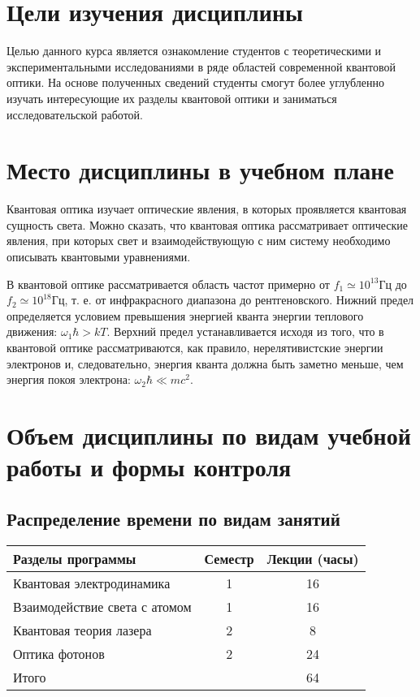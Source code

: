 


\Russian


\section{Цели изучения дисциплины}
Целью данного курса является ознакомление студентов с теоретическими и
экспериментальными исследованиями в ряде областей современной
квантовой оптики.  На основе полученных сведений студенты смогут более
углубленно  изучать интересующие их разделы квантовой оптики и
заниматься исследовательской работой. 

\section{Место дисциплины в учебном плане}
Квантовая оптика изучает оптические явления, в которых проявляется
квантовая сущность света. Можно сказать, что квантовая оптика
рассматривает оптические явления, при которых свет и взаимодействующую
с ним систему необходимо описывать квантовыми уравнениями. 

В квантовой оптике рассматривается область частот примерно от 
\(f_1 \simeq 10^{13} \mbox{Гц}\) до \(f_2 \simeq 10^{18}
\mbox{Гц}\), т. е. от инфракрасного диапазона до
рентгеновского. Нижний предел определяется условием превышения
энергией кванта энергии теплового движения: 
\(\omega_1 \hbar > k T\). Верхний предел
устанавливается исходя из того, что в квантовой оптике
рассматриваются, как правило, нерелятивистские энергии электронов и,
следовательно, энергия кванта должна быть заметно меньше, чем энергия
покоя электрона: \(\omega_2 \hbar \ll m c^2\).

\section{Объем дисциплины по видам учебной работы и формы контроля}
\subsection{Распределение времени по видам занятий}
\begin{longtable}{|l|c|c|}
\hline
Разделы программы & Семестр & Лекции (часы) \\ \hline
Квантовая электродинамика & 1 & 16 \\ 
Взаимодействие света с атомом & 1 & 16\\ 
Квантовая теория лазера & 2 & 8 \\ 
Оптика фотонов & 2  & 24 \\ \hline
Итого & & 64 \\ \hline
\end{longtable}

